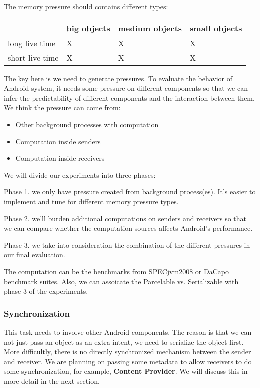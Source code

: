 \documentclass[11pt]{article}
\begin{document}
The memory pressure should contains different \label{Memory-Pressure-Types}types:
\begin{center}
\begin{tabular}{l|lll}
 & big objects & medium objects & small objects\\
\hline
long live time & X & X & X\\
short live time & X & X & X\\
\end{tabular}
\end{center}

The key here is we need to generate pressures.
To evaluate the behavior of Android system, it needs some pressure on
different components so that we can infer the predictability of different
components and the interaction between them.
We think the pressure can come from:

\begin{itemize}
\item Other background processes with computation
\item Computation inside senders
\item Computation inside receivers
\end{itemize}

We will divide our experiments into three phases:

Phase 1. we only have pressure created from background process(es).
It's easier to implement and tune for different \hyperref[Memory-Pressure-Types]{memory pressure types}.

Phase 2. we'll burden additional computations on senders and receivers so that we can compare
whether the computation sources affects Android's performance.

Phase 3. we take into consideration the combination of the different pressures in our final evaluation.

The computation can be the benchmarks from SPECjvm2008 or DaCapo benchmark suites.
Also, we can assoicate the \hyperref[Parcelable/Serializable]{Parcelable vs. Serializable} with phase 3 of the experiments.

\subsubsection{Synchronization}
\label{sec-3-2-2}
This task needs to involve other Android components.
The reason is that we can not just pass an object as an extra intent, we need to serialize the object first.
More difficultly, there is no directly synchronized mechanism between the sender and receiver.
We are planning on passing some metadata to allow receivers to do some synchronization, for example, \textbf{Content Provider}. We will discuss this in more detail in the next section.
\end{document}
